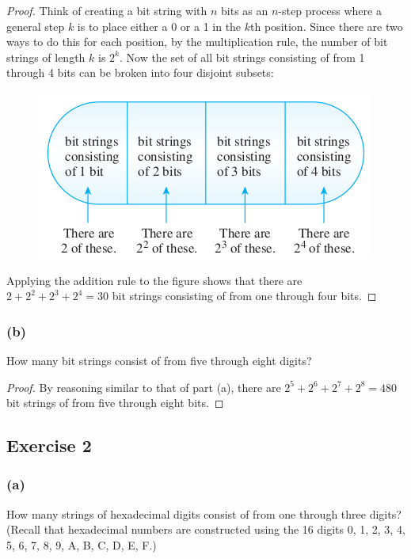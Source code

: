 \documentclass[14pt]{extarticle}
\begin{document}
\begin{proof}
Think of creating a bit string with $n$ bits as an $n$-step process where a general step $k$ is to place either a 0 or 
a 1 in the $k$th position. Since there are two ways to do this for each position, by the multiplication rule, the 
number of bit strings of length $k$ is $2^k$. Now the set of all bit strings consisting of from 1 through 4 bits can 
be broken into four disjoint subsets:

\begin{figure}[ht!]
\centering
\includegraphics[scale=0.6]{../images/9.3.1.a.png}
\end{figure}

Applying the addition rule to the figure shows that there are \(2 + 2^2 + 2^3 + 2^4 = 30\) bit strings consisting of 
from one through four bits.
\end{proof}

\subsubsection{(b)}
How many bit strings consist of from five through eight digits?

\begin{proof}
By reasoning similar to that of part (a), there are \(2^5 + 2^6 + 2^7 + 2^8 = 480\) bit strings of from five through 
eight bits.
\end{proof}

\subsection{Exercise 2}
\subsubsection{(a)}
How many strings of hexadecimal digits consist of from one through three digits? (Recall that hexadecimal numbers are 
constructed using the 16 digits 0, 1, 2, 3, 4, 5, 6, 7, 8, 9, A, B, C, D, E, F.)
\end{document}
